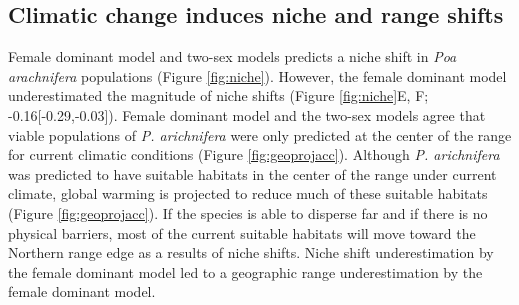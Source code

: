 \documentclass[12pt]{article}\usepackage[]{graphicx}\usepackage[dvipsnames]{xcolor}
\begin{document}
\subsection*{Climatic change induces niche and range shifts}
Female dominant model and  two-sex models predicts a niche shift in \emph{Poa arachnifera} populations (Figure \ref{fig:niche}). 
%  
However, the female dominant model underestimated the magnitude of niche shifts (Figure \ref{fig:niche}E, F; -0.16[-0.29,-0.03]).
Female dominant model and the two-sex models agree that viable populations of \emph{P. arichnifera} were only predicted at the center of the range for current climatic conditions (Figure \ref{fig:geoprojacc}).
Although \emph{P. arichnifera} was predicted to have suitable habitats in the center of the range under current climate, global  warming is projected to reduce much of these suitable habitats (Figure \ref{fig:geoprojacc}). 
If the species is able to disperse far and if there is no physical barriers, most of the current suitable habitats will move toward the Northern range edge as a results of niche shifts. 
Niche shift underestimation by the female dominant model led to a geographic range underestimation by the female dominant model.  
\end{document}
